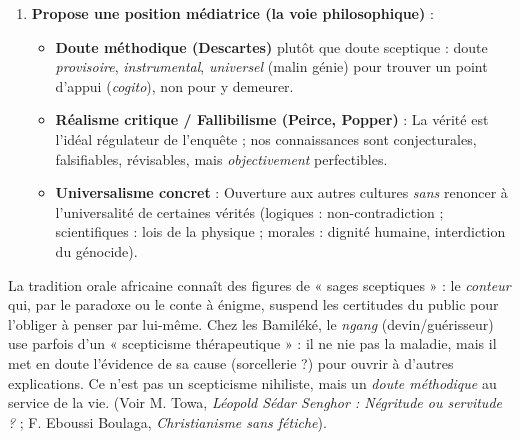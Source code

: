\documentclass[11pt]{article}
\begin{document}
\begin{methode}
\begin{enumerate}
\begin{itemize}
\end{itemize}
\item \textbf{Propose une position médiatrice (la voie philosophique)} :
\begin{itemize}
\item \textbf{Doute méthodique (Descartes)} plutôt que doute sceptique : doute \emph{provisoire}, \emph{instrumental}, \emph{universel} (malin génie) pour trouver un point d'appui (\emph{cogito}), non pour y demeurer.
\item \textbf{Réalisme critique / Fallibilisme (Peirce, Popper)} : La vérité est l'idéal régulateur de l'enquête ; nos connaissances sont conjecturales, falsifiables, révisables, mais \emph{objectivement} perfectibles.
\item \textbf{Universalisme concret} : Ouverture aux autres cultures \emph{sans} renoncer à l'universalité de certaines vérités (logiques : non-contradiction ; scientifiques : lois de la physique ; morales : dignité humaine, interdiction du génocide).
\end{itemize}
\end{enumerate}
\end{methode}

\begin{savaistu}
La tradition orale africaine connaît des figures de « sages sceptiques » : le \emph{conteur} qui, par le paradoxe ou le conte à énigme, suspend les certitudes du public pour l'obliger à penser par lui-même. Chez les Bamiléké, le \emph{ngang} (devin/guérisseur) use parfois d'un « scepticisme thérapeutique » : il ne nie pas la maladie, mais il met en doute l'évidence de sa cause (sorcellerie ?) pour ouvrir à d'autres explications. Ce n'est pas un scepticisme nihiliste, mais un \emph{doute méthodique} au service de la vie. (Voir M. Towa, \emph{Léopold Sédar Senghor : Négritude ou servitude ?} ; F. Eboussi Boulaga, \emph{Christianisme sans fétiche}).
\end{savaistu}
\end{document}
